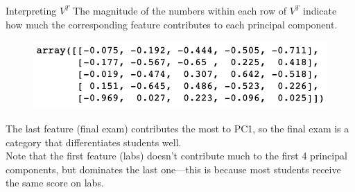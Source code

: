 \documentclass[aspectratio=169]{../latex_main/tntbeamer}  %
\begin{document}
	
	\begin{frame}{Interpreting $V^T$}
	    The magnitude of the numbers within each row of $V^T$ indicate how much the corresponding feature contributes to each principal component.
	    \begin{figure}
	        \centering
	        \includegraphics[scale=.5]{Bild16}
	    \end{figure}
	    
	    The last feature (final exam) contributes the most to PC1, so the final exam is a category that differentiates students well. \\
	    Note that the first feature (labs) doesn’t contribute much to the first 4 principal components, but dominates the last one—this is because most students receive the same score on labs.
	\end{frame}
	
\end{document}
